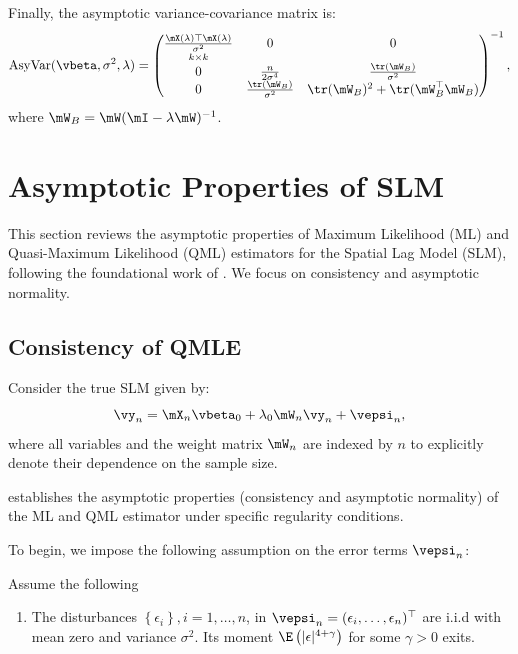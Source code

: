 \documentclass[english,12pt]{book}\usepackage[]{graphicx}\usepackage[]{xcolor}
\begin{document}
Finally, the asymptotic variance-covariance matrix is:
\begin{equation}\label{eq:asyvar_sem}
\mbox{AsyVar}(\vbeta, \sigma^2, \lambda)  = 
\begin{pmatrix}
 \underset{k \times k}{\frac{\mX(\lambda)\top\mX(\lambda)}{\sigma^2}} & 0 & 0 \\
  0 & \frac{n}{2\sigma^4} & \frac{\tr(\mW_B)}{\sigma^2} \\
 0 & \frac{\tr(\mW_B)}{\sigma^2} & \tr(\mW_B)^2 + \tr(\mW_B^\top\mW_B)
\end{pmatrix}^{-1},
\end{equation}
%
where $\mW_B = \mW(\mI - \lambda\mW)^{-1}$.

\section{Asymptotic Properties of SLM}

This section reviews the asymptotic properties of Maximum Likelihood (ML) and Quasi-Maximum Likelihood (QML) estimators for the Spatial Lag Model (SLM), following the foundational work of \cite{lee2004asymptotic}. We focus on consistency and asymptotic normality.


\subsection{Consistency of QMLE}

Consider the true SLM given by:
\begin{equation*}
\vy_n = \mX_n\vbeta_0 + \lambda_0\mW_n\vy_n + \vepsi_n,
\end{equation*}
%
where all variables and the weight matrix $\mW_n$ are indexed by \(n\) to explicitly denote their dependence on the sample size.

\cite{lee2004asymptotic} establishes the asymptotic properties (consistency and asymptotic normality) of the ML and QML estimator under specific regularity conditions. 

To begin, we impose the following assumption on the error terms \(\vepsi_n\):

\begin{assumption}\label{assu:ml_1}
Assume the following
  \begin{enumerate}
    \item The disturbances $\left\lbrace \epsilon_{i}\right\rbrace, i = 1, \ldots, n$, in $\vepsi_n = (\epsilon_i, \ldots, \epsilon_n)^\top$ are i.i.d with mean zero and variance $\sigma^2$. Its moment $\E\left(|\epsilon|^{4 + \gamma}\right)$ for some $\gamma > 0$ exits.
  \end{enumerate}  
\end{assumption}
\end{document}
